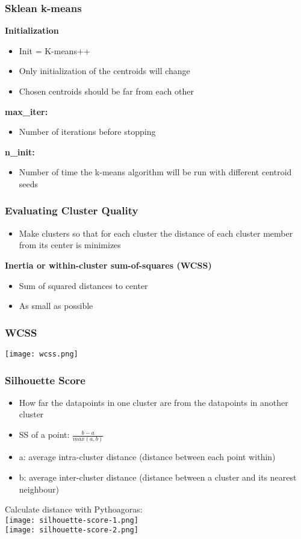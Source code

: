 \subsubsection{Sklean k-means}
\textbf{Initialization}
\begin{itemize}
    \item Init = K-means++
    \item Only initialization of the centroids will change
    \item Chosen centroids should be far from each other
\end{itemize}
\textbf{max\_iter:}
\begin{itemize}
    \item Number of iterations before stopping
\end{itemize}
\textbf{n\_init:}
\begin{itemize}
    \item Number of time the k-means algorithm will be run with different centroid seeds
\end{itemize}

\subsubsection{Evaluating Cluster Quality}
\begin{itemize}
    \item Make clusters so that for each cluster the distance of each cluster member from its center is minimizes
\end{itemize}
\textbf{Inertia or within-cluster sum-of-squares (WCSS)}
\begin{itemize}
    \item Sum of squared distances to center
    \item As small as possible
\end{itemize}
\subsubsection{WCSS}
\texttt{[image: wcss.png]}

\subsubsection{Silhouette Score}
\begin{itemize}
    \item How far the datapoints in one cluster are from the datapoints in another cluster
    \item SS of a point: $\frac{b-a}{max(a,b)}$
    \item a: average intra-cluster distance (distance between each point within)
    \item b: average inter-cluster distance (distance between a cluster and its nearest neighbour)
\end{itemize}
Calculate distance with Pythoagoras:\\
\texttt{[image: silhouette-score-1.png]}\\
\texttt{[image: silhouette-score-2.png]}